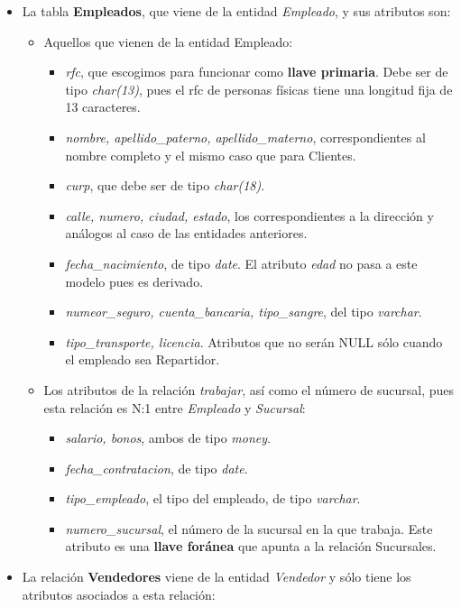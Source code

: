 \documentclass[11pt]{article}
\begin{document}
\begin{itemize}
\item La tabla \textbf{Empleados}, que viene de la entidad \textit{Empleado}, y sus atributos son:
    \begin{itemize}
    \item Aquellos que vienen de la entidad Empleado:
    \begin{itemize}
            \item \textit{rfc}, que escogimos para funcionar como \textbf{llave primaria}. Debe ser de tipo \textit{char(13)}, pues el rfc de personas físicas tiene una longitud fija de 13 caracteres.
        \item \textit{nombre, apellido\_paterno, apellido\_materno}, correspondientes al nombre completo y el mismo caso que para Clientes.
        \item \textit{curp}, que debe ser de tipo \textit{char(18)}.
        \item \textit{calle, numero, ciudad, estado}, los correspondientes a la dirección y análogos al caso de las entidades anteriores.
        \item \textit{fecha\_nacimiento}, de tipo \textit{date}. El atributo \textit{edad} no pasa a este modelo pues es derivado.
        \item \textit{numeor\_seguro, cuenta\_bancaria, tipo\_sangre}, del tipo \textit{varchar}.
        \item \textit{tipo\_transporte, licencia}. Atributos que no serán NULL sólo cuando el empleado sea Repartidor. 
    \end{itemize}
    \item Los atributos de la relación \textit{trabajar}, así como el número de sucursal, pues esta relación es N:1 entre \textit{Empleado} y \textit{Sucursal}:
    \begin{itemize}
        \item \textit{salario, bonos}, ambos de tipo \textit{money}.
        \item \textit{fecha\_contratacion}, de tipo \textit{date}.
        \item \textit{tipo\_empleado}, el tipo del empleado, de tipo \textit{varchar}.
        \item \textit{numero\_sucursal}, el número de la sucursal en la que trabaja. Este atributo es una \textbf{llave foránea} que apunta a la relación Sucursales.
    \end{itemize}
    \end{itemize}
\item La relación \textbf{Vendedores} viene de la entidad \textit{Vendedor} y sólo tiene los atributos asociados a esta relación:

\end{itemize}
\end{document}
